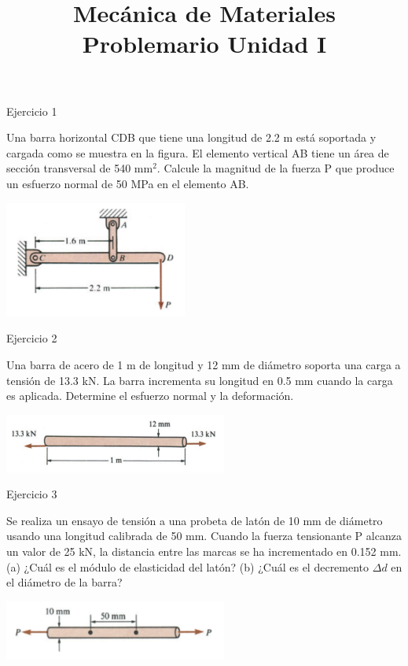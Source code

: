 \documentclass[12pt,letterpaper]{article}
\title{
{\Large Mecánica de Materiales} \\
{\large Problemario Unidad I} \\
}
\begin{document}
\maketitle

\begin{ejemplo}{Ejercicio 1}

Una barra horizontal CDB que tiene una longitud de 2.2 m está soportada y cargada como se muestra 
en la figura. El elemento vertical AB tiene un área de sección transversal de 540 $\text{mm}^2$. 
Calcule la magnitud de la fuerza P que produce un esfuerzo normal de 50 MPa en el elemento AB.

\begin{center}
\includegraphics[width=0.45\textwidth]{img/p01.PNG}
\end{center}

\end{ejemplo}


\begin{ejemplo}{Ejercicio 2}

Una barra de acero de 1 m de longitud y 12 mm de diámetro soporta una carga a tensión de 13.3 kN. La barra 
incrementa su longitud en 0.5 mm cuando la carga es aplicada. Determine el esfuerzo normal y la deformación.

\begin{center}
\includegraphics[width=0.55\textwidth]{img/p02.PNG}
\end{center}

\end{ejemplo}


\begin{ejemplo}{Ejercicio 3}

Se realiza un ensayo de tensión a una probeta de latón de 10 mm de diámetro usando una longitud calibrada de 50 mm. 
Cuando la fuerza tensionante P alcanza un valor de 25 kN, la distancia entre las marcas se ha incrementado 
en 0.152 mm. (a) ¿Cuál es el módulo de elasticidad del latón? (b) ¿Cuál es el decremento $\Delta d$ en el 
diámetro de la barra?

\begin{center}
\includegraphics[width=0.55\textwidth]{img/p03.PNG}
\end{center}

\end{ejemplo}
\end{document}
